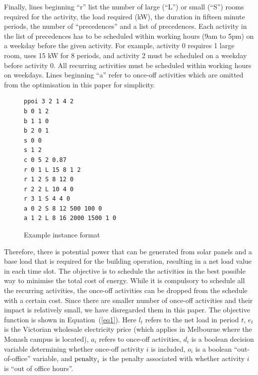 \documentclass[conference]{IEEEtran}
\begin{document}
Finally, lines beginning ``r'' list the number of large (``L'') or small (``S'') rooms required for the activity, the load required (kW), the duration in fifteen minute periods, the number of ``precedences'' and a list of precedences. Each activity in the list of precedences has to be scheduled within working hours (9am to 5pm) on a weekday before the given activity. For example, activity 0 requires 1 large room, uses 15 kW for 8 periods, and activity 2 must be scheduled on a weekday before activity 0. All recurring activities must be scheduled within working hours on weekdays. Lines beginning ``a'' refer to once-off activities which are omitted from the optimisation in this paper for simplicity.

\begin{figure}
\centering
\begin{verbatim}
ppoi 3 2 1 4 2
b 0 1 2
b 1 1 0
b 2 0 1
s 0 0
s 1 2
c 0 5 2 0.87
r 0 1 L 15 8 1 2
r 1 2 S 8 12 0
r 2 2 L 10 4 0
r 3 1 S 4 4 0
a 0 2 S 8 12 500 100 0
a 1 2 L 8 16 2000 1500 1 0
\end{verbatim}
\caption{Example instance format}
\label{fig:instance}
\end{figure}

Therefore, there is potential power that can be generated from solar panels and a base load that is required for the building operation, resulting in a net load value in each time slot.  The objective is to schedule the activities in the best possible way to minimise the total cost of energy. While it is compulsory to schedule all the recurring activities, the once-off activities can be dropped from the schedule with a certain cost. Since there are smaller number of once-off activities and their impact is relatively small, we have disregarded them in this paper.  The objective function is shown in Equation~(\ref{eq1}). Here $l_t$ refers to the net load in period $t$, $e_t$ is the Victorian wholesale electricity price (which applies in Melbourne where the Monash campus is located), $a_i$ refers to once-off activities, $d_i$ is a boolean decision variable determining whether once-off activity $i$ is included, $o_i$ is a boolean ``out-of-office'' variable, and ${\rm penalty}_i$ is the penalty associated with whether activity $i$ is ``out of office hours''.
\end{document}
